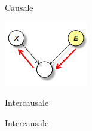 \begin{figure}[!ht]
\begin{subfigure}[b]{0.14\textwidth}
        \caption{Causale}
        \label{fig:causale}
    \end{subfigure}
    \hfill
    \begin{subfigure}[b]{0.26\textwidth}
        \includegraphics[width=\textwidth]{./img/Reti/Intercausale.png}
        \caption{Intercausale}
        \caption{Intercausale}
        \label{fig:intercausale}
    \end{subfigure}
    \hfill
    \begin{subfigure}[b]{0.14\textwidth}

\end{subfigure}
\end{figure}
